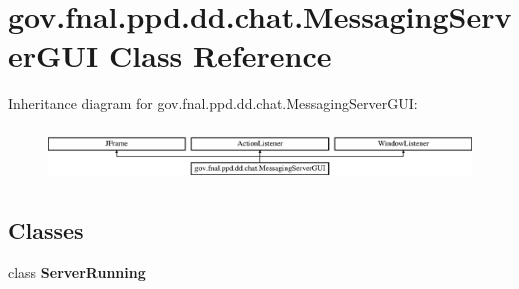 \hypertarget{classgov_1_1fnal_1_1ppd_1_1dd_1_1chat_1_1MessagingServerGUI}{\section{gov.\-fnal.\-ppd.\-dd.\-chat.\-Messaging\-Server\-G\-U\-I Class Reference}
\label{classgov_1_1fnal_1_1ppd_1_1dd_1_1chat_1_1MessagingServerGUI}
}
Inheritance diagram for gov.\-fnal.\-ppd.\-dd.\-chat.\-Messaging\-Server\-G\-U\-I\-:\begin{figure}[H]
\begin{center}
\leavevmode
\includegraphics[height=1.430396cm]{classgov_1_1fnal_1_1ppd_1_1dd_1_1chat_1_1MessagingServerGUI}
\end{center}
\end{figure}
\subsection*{Classes}
\begin{DoxyCompactItemize}
\item 
class {\bfseries Server\-Running}
\end{DoxyCompactItemize}

